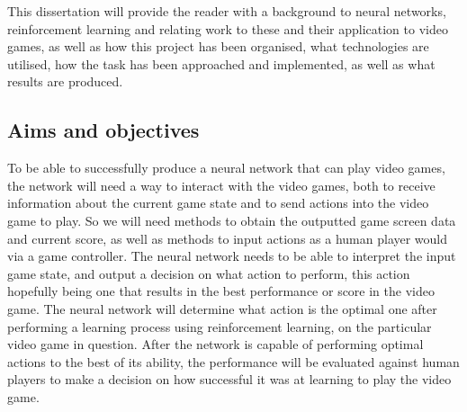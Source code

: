 \documentclass[10pt]{article}
\begin{document}
	 This dissertation will provide the reader with a background to neural networks, reinforcement learning and relating work to these and their application to video games, as well as how this project has been organised, what technologies are utilised, how the task has been approached and implemented, as well as what results are produced.
	
	
	
	
	
\bigskip

\subsection{Aims and objectives}
	To be able to successfully produce a neural network that can play video games, the network will need a way to interact with the video games, both to receive information about the current game state and to send actions into the video game to play. So we will need methods to obtain the outputted game screen data and current score, as well as methods to input actions as a human player would via a game controller. The neural network needs to be able to interpret the input game state, and output a decision on what action to perform, this action hopefully being one that results in the best performance or score in the video game. The neural network will determine what action is the optimal one after performing a learning process using reinforcement learning, on the particular video game in question. After the network is capable of performing optimal actions to the best of its ability, the performance will be evaluated against human players to make a decision on how successful it was at learning to play the video game.\\
	
\end{document}
